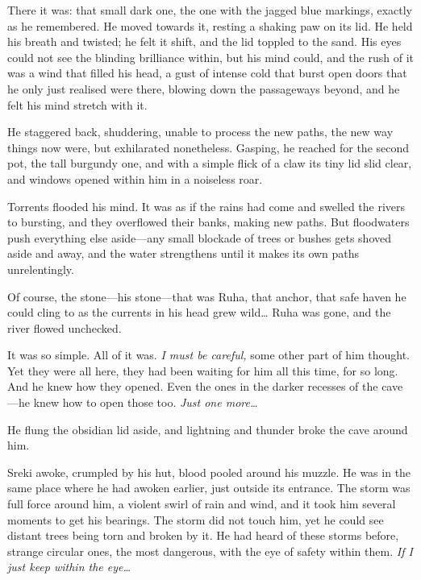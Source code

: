 There it was: that small dark one, the one with the jagged blue markings, exactly as he remembered. He moved towards it, resting a shaking paw on its lid. He held his breath and twisted; he felt it shift, and the lid toppled to the sand. His eyes could not see the blinding brilliance within, but his mind could, and the rush of it was a wind that filled his head, a gust of intense cold that burst open doors that he only just realised were there, blowing down the passageways beyond, and he felt his mind stretch with it.

He staggered back, shuddering, unable to process the new paths, the new way things now were, but exhilarated nonetheless. Gasping, he reached for the second pot, the tall burgundy one, and with a simple flick of a claw its tiny lid slid clear, and windows opened within him in a noiseless roar.

Torrents flooded his mind. It was as if the rains had come and swelled the rivers to bursting, and they overflowed their banks, making new paths. But floodwaters push everything else aside---any small blockade of trees or bushes gets shoved aside and away, and the water strengthens until it makes its own paths unrelentingly.

Of course, the stone---his stone---that was Ruha, that anchor, that safe haven he could cling to as the currents in his head grew wild\ldots{} Ruha was gone, and the river flowed unchecked.

It was so simple. All of it was. \emph{I must be careful,} some other part of him thought. Yet they were all here, they had been waiting for him all this time, for so long. And he knew how they opened. Even the ones in the darker recesses of the cave---he knew how to open those too. \emph{Just one more\ldots{}}

He flung the obsidian lid aside, and lightning and thunder broke the cave around him.

\secdiv

\noindent Sreki awoke, crumpled by his hut, blood pooled around his muzzle. He was in the same place where he had awoken earlier, just outside its entrance. The storm was full force around him, a violent swirl of rain and wind, and it took him several moments to get his bearings. The storm did not touch him, yet he could see distant trees being torn and broken by it. He had heard of these storms before, strange circular ones, the most dangerous, with the eye of safety within them. \emph{If I just keep within the eye\ldots{}}

